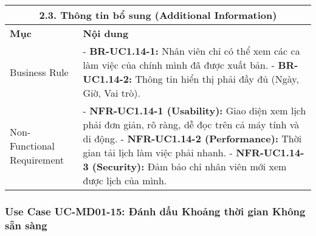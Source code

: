 \begin{longtable}{|m{4cm}|p{11cm}|}
\hline
\multicolumn{2}{|c|}{\textbf{2.3. Thông tin bổ sung (Additional Information)}} \\
\hline
\textbf{Mục} & \textbf{Nội dung} \\
\hline
Business Rule & - \textbf{BR-UC1.14-1:} Nhân viên chỉ có thể xem các ca làm việc của chính mình đã được xuất bản. \newline - \textbf{BR-UC1.14-2:} Thông tin hiển thị phải đầy đủ (Ngày, Giờ, Vai trò). \\
\hline
Non-Functional Requirement & - \textbf{NFR-UC1.14-1 (Usability):} Giao diện xem lịch phải đơn giản, rõ ràng, dễ đọc trên cả máy tính và di động. \newline - \textbf{NFR-UC1.14-2 (Performance):} Thời gian tải lịch làm việc phải nhanh. \newline - \textbf{NFR-UC1.14-3 (Security):} Đảm bảo chỉ nhân viên mới xem được lịch của mình. \\
\hline
\end{longtable}

\subsubsection{Use Case UC-MD01-15: Đánh dấu Khoảng thời gian Không sẵn sàng}

